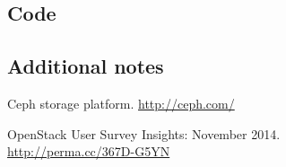 \documentclass{article}
\begin{document}
\subsection{Code}


\subsection{Additional notes}


\begin{thebibliography}{1}

   Ceph storage platform. \url{http://ceph.com/} 

   OpenStack User Survey Insights: November 2014. \\
  \url{http://perma.cc/367D-G5YN} 


\end{thebibliography}
	
\end{document}
